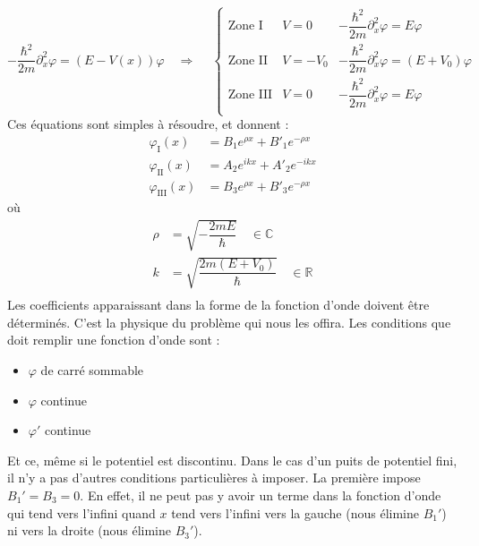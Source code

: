 \documentclass{book}
\begin{document}
\begin{equation}
  -\dfrac{\hbar^2}{2m} \partial_x ^2 \varphi = (E-V(x)) \varphi 
  \quad \Rightarrow \quad \ \left\{ 
    \begin{array}{lll}
      \text{Zone I} & V = 0 & -\dfrac{\hbar^2}{2m} \partial_x ^2 \varphi = E \varphi \\
      \text{Zone II} & V = -V_0 & -\dfrac{\hbar^2}{2m} \partial_x ^2 \varphi = (E+V_0) \varphi \\
      \text{Zone III} & V = 0 & -\dfrac{\hbar^2}{2m} \partial_x ^2 \varphi = E \varphi \\
    \end{array}
    \right. 
  \end{equation}
  Ces équations sont simples à résoudre, et donnent :
  \begin{align}
    \varphi_{\mathrm{I}}(x) &= B_1 e^{\rho x} + B' _1 e^{-\rho x} \\
    \varphi_{\mathrm{II}}(x) &= A_2 e^{ik x} + A' _2 e^{-ik x} \\
    \varphi_{\mathrm{III}}(x) &= B_3 e^{\rho x} + B' _3 e^{-\rho x} 
  \end{align}
  où
  \begin{align}
    \rho &= \sqrt{-\dfrac{2mE}{\hbar}} \quad \in \mathbb{C} \\
    k &= \sqrt{\dfrac{2m(E+V_0)}{\hbar}} \quad \in \mathbb{R} \\
  \end{align}
  Les coefficients apparaissant dans la forme de la fonction d'onde doivent être déterminés. C'est la physique du problème qui nous les offira. Les conditions que doit remplir une fonction d'onde sont :
  \begin{itemize}
    \item $\varphi$ de carré sommable
    \item $\varphi$ continue 
    \item $\varphi'$ continue
  \end{itemize}
  Et ce, même si le potentiel est discontinu. Dans le cas d'un puits de potentiel fini, il n'y a pas d'autres conditions particulières à imposer. La première impose $B_1' = B_3 = 0$. En effet, il ne peut pas y avoir un terme dans la fonction d'onde qui tend vers l'infini quand $x$ tend vers l'infini vers la gauche (nous élimine $B_1'$) ni vers la droite (nous élimine $B_3'$). \\
  
\end{document}
